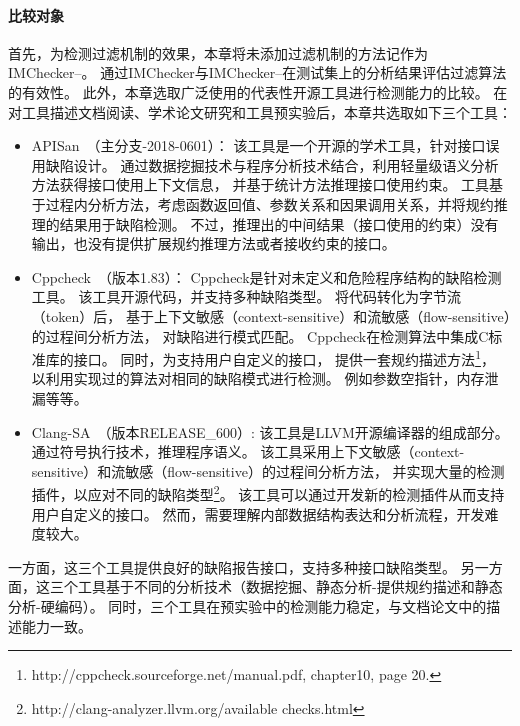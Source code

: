 \paragraph{比较对象}
首先，为检测过滤机制的效果，本章将未添加过滤机制的方法记作为IMChecker--。
通过IMChecker与IMChecker--在测试集上的分析结果评估过滤算法的有效性。
此外，本章选取广泛使用的代表性开源工具进行检测能力的比较。
在对工具描述文档阅读、学术论文研究和工具预实验后，本章共选取如下三个工具：
\begin{itemize}
	\item APISan~\cite{16-sec-apisan}（主分支-2018-0601）：
	该工具是一个开源的学术工具，针对接口误用缺陷设计。
	通过数据挖掘技术与程序分析技术结合，利用轻量级语义分析方法获得接口使用上下文信息，
	并基于统计方法推理接口使用约束。
	工具基于过程内分析方法，考虑函数返回值、参数关系和因果调用关系，并将规约推理的结果用于缺陷检测。
	不过，推理出的中间结果（接口使用的约束）没有输出，也没有提供扩展规约推理方法或者接收约束的接口。
	\item Cppcheck~\cite{cppcheck}（版本1.83）：
	Cppcheck是针对未定义和危险程序结构的缺陷检测工具。
	该工具开源代码，并支持多种缺陷类型。
	将代码转化为字节流（token）后，
	基于上下文敏感（context-sensitive）和流敏感（flow-sensitive）的过程间分析方法，
	对缺陷进行模式匹配。
	Cppcheck在检测算法中集成C标准库的接口。
	同时，为支持用户自定义的接口，
	提供一套规约描述方法\footnote{http://cppcheck.sourceforge.net/manual.pdf, chapter10, page 20.}，
	以利用实现过的算法对相同的缺陷模式进行检测。
	例如参数空指针，内存泄漏等等。
	\item Clang-SA~\cite{clang-sa}（版本RELEASE\_600）:
	该工具是LLVM开源编译器的组成部分。
	通过符号执行技术，推理程序语义。
	该工具采用上下文敏感（context-sensitive）和流敏感（flow-sensitive）的过程间分析方法，
	并实现大量的检测插件，以应对不同的缺陷类型\footnote{http://clang-analyzer.llvm.org/available checks.html}。
	该工具可以通过开发新的检测插件从而支持用户自定义的接口。
	然而，需要理解内部数据结构表达和分析流程，开发难度较大。
\end{itemize} 
一方面，这三个工具提供良好的缺陷报告接口，支持多种接口缺陷类型。
另一方面，这三个工具基于不同的分析技术（数据挖掘、静态分析-提供规约描述和静态分析-硬编码）。
同时，三个工具在预实验中的检测能力稳定，与文档论文中的描述能力一致。

